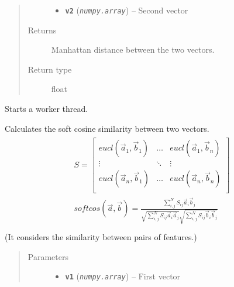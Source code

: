 \documentclass[letterpaper,10pt,english]{sphinxmanual}
\begin{document}
\begin{fulllineitems}
\begin{fulllineitems}
\begin{quote}
\begin{description}
\begin{itemize}
\item {} 
\textbf{\texttt{v2}} (\emph{\texttt{numpy.array}}) -- Second vector

\end{itemize}

\item[{Returns}] \leavevmode
Manhattan distance between the two vectors.

\item[{Return type}] \leavevmode
float

\end{description}\end{quote}

\end{fulllineitems}


\begin{fulllineitems}
\label{src.mapping:src.mapping.mapthreading.MappingWorkerThread.run}
Starts a worker thread.

\end{fulllineitems}


\begin{fulllineitems}
\label{src.mapping:src.mapping.mapthreading.MappingWorkerThread.soft_cosine_similarity}
Calculates the soft cosine similarity between two vectors.
\begin{align*}\!\begin{aligned}
S = \begin{bmatrix}
        eucl(\vec{a}_1, \vec{b}_1) & \ldots & eucl(\vec{a}_1, \vec{b}_n) \\
        \vdots & \ddots & \vdots \\
        eucl(\vec{a}_n, \vec{b}_1) & \ldots & eucl(\vec{a}_n, \vec{b}_n) \\
\end{bmatrix}\\
softcos(\vec{a}, \vec{b}) = \frac{\sum_{i,j}^N S_{ij}\vec{a}_i\vec{b}_j}{\sqrt{\sum_{i,
j}^N S_{ij}\vec{a}_i\vec{a}_j}\sqrt{\sum_{i,j}^N S_{ij}\vec{b}_i\vec{b}_j}}\\
\end{aligned}\end{align*}
(It considers the similarity between pairs of features.)
\begin{quote}\begin{description}
\item[{Parameters}] \leavevmode\begin{itemize}
\item {} 
\textbf{\texttt{v1}} (\emph{\texttt{numpy.array}}) -- First vector


\end{itemize}
\end{description}
\end{quote}
\end{fulllineitems}
\end{fulllineitems}
\end{document}
